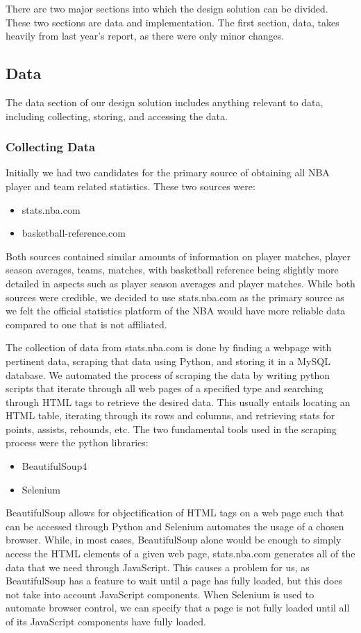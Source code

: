 There are two major sections into which the design solution can be divided. These two sections are data and implementation. The first section, data, takes heavily from last year's report, as there were only minor changes. 

\subsection{Data}

The data section of our design solution includes anything relevant to data, including collecting, storing, and accessing the data.
\subsubsection{Collecting Data}
Initially we had two candidates for the primary source of obtaining all NBA player and team related statistics. These two sources were: 
\begin{itemize}
\item stats.nba.com
\item basketball-reference.com
\end{itemize}
Both sources contained similar amounts of information on player matches, player season averages, teams, matches, with basketball reference being slightly more detailed in aspects such as player season averages and player matches. While both sources were credible, we decided to use stats.nba.com as the primary source as we felt the official statistics platform of the NBA would have more reliable data compared to one that is not affiliated.

The collection of data from stats.nba.com is done by finding a webpage with pertinent data, scraping that data using Python, and storing it in a MySQL database. We automated the process of scraping the data by writing python scripts that iterate through all web pages of a specified type and searching through HTML tags to retrieve the desired data. This usually entails locating an HTML table, iterating through its rows and columns, and retrieving stats for points, assists, rebounds, etc. The two fundamental tools used in the scraping process were the python libraries:
\begin{itemize}
\item BeautifulSoup4
\item Selenium
\end{itemize}

BeautifulSoup allows for objectification of HTML tags on a web page such that can be accessed  through Python and Selenium automates the usage of a chosen browser. While, in most cases, BeautifulSoup alone would be enough to simply access the HTML elements of a given web page, stats.nba.com generates all of the data that we need through JavaScript. This causes a problem for us, as BeautifulSoup has a feature to wait until a page has fully loaded, but this does not take into account JavaScript components. When Selenium is used to automate browser control, we can specify that a page is not fully loaded until all of its JavaScript components have fully loaded.


